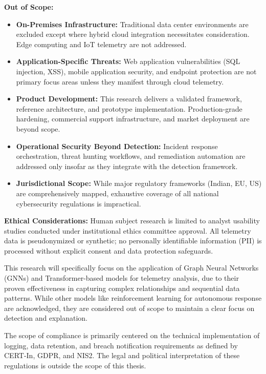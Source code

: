 \textbf{Out of Scope:}
\begin{itemize}
    \item \textbf{On-Premises Infrastructure:} Traditional data center environments are excluded except where hybrid cloud integration necessitates consideration. Edge computing and IoT telemetry are not addressed.
    \item \textbf{Application-Specific Threats:} Web application vulnerabilities (SQL injection, XSS), mobile application security, and endpoint protection are not primary focus areas unless they manifest through cloud telemetry.
    \item \textbf{Product Development:} This research delivers a validated framework, reference architecture, and prototype implementation. Production-grade hardening, commercial support infrastructure, and market deployment are beyond scope.
    \item \textbf{Operational Security Beyond Detection:} Incident response orchestration, threat hunting workflows, and remediation automation are addressed only insofar as they integrate with the detection framework.
    \item \textbf{Jurisdictional Scope:} While major regulatory frameworks (Indian, EU, US) are comprehensively mapped, exhaustive coverage of all national cybersecurity regulations is impractical.
\end{itemize}

\textbf{Ethical Considerations:} Human subject research is limited to analyst usability studies conducted under institutional ethics committee approval. All telemetry data is pseudonymized or synthetic; no personally identifiable information (PII) is processed without explicit consent and data protection safeguards.

This research will specifically focus on the application of Graph Neural Networks (GNNs) and Transformer-based models for telemetry analysis, due to their proven effectiveness in capturing complex relationships and sequential data patterns. While other models like reinforcement learning for autonomous response are acknowledged, they are considered out of scope to maintain a clear focus on detection and explanation.

The scope of compliance is primarily centered on the technical implementation of logging, data retention, and breach notification requirements as defined by CERT-In, GDPR, and NIS2. The legal and political interpretation of these regulations is outside the scope of this thesis.

